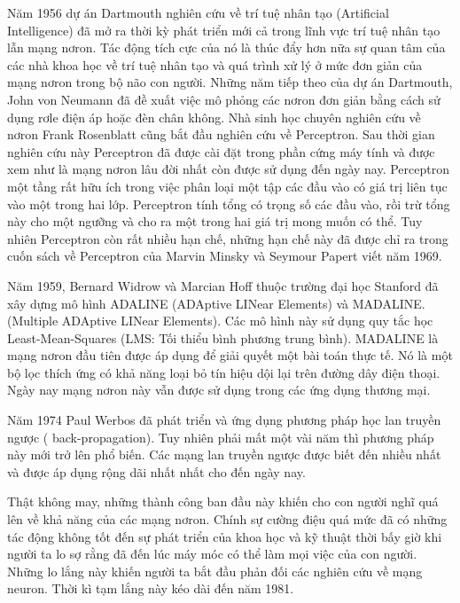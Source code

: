 Năm 1956 dự án Dartmouth nghiên cứu về trí tuệ nhân tạo (Artificial Intelligence) đã mở ra thời kỳ phát triển mới cả trong lĩnh vực trí tuệ nhân tạo lẫn mạng nơron. Tác động tích cực của nó là thúc đẩy hơn nữa sự quan tâm của các nhà khoa học về trí tuệ nhân tạo và quá trình xử lý ở mức đơn giản của mạng nơron trong bộ não con người. 
Những năm tiếp theo của dự án Dartmouth, John von Neumann đã đề xuất việc mô phỏng các nơron đơn giản bằng cách sử dụng rơle điện áp hoặc đèn chân không. Nhà sinh học chuyên nghiên cứu về nơron Frank Rosenblatt cũng bắt đầu nghiên cứu về Perceptron. Sau thời gian nghiên cứu này Perceptron đã được cài đặt trong phần cứng máy tính và được xem như là mạng nơron lâu đời nhất còn được sử dụng đến ngày nay. Perceptron một tầng rất hữu ích trong việc phân loại một tập các đầu vào có giá trị liên tục vào một trong hai lớp. Perceptron tính tổng có trọng số các đầu vào, rồi trừ tổng này cho một ngưỡng và cho ra một trong hai giá trị mong muốn có thể. Tuy nhiên Perceptron còn rất nhiều hạn chế, những hạn chế này đã được chỉ ra trong cuốn sách về Perceptron của Marvin Minsky và Seymour Papert viết năm 1969. 

Năm 1959, Bernard Widrow và Marcian Hoff thuộc trường đại học Stanford đã xây dựng mô hình ADALINE (ADAptive LINear Elements) và MADALINE. (Multiple ADAptive LINear Elements). Các mô hình này sử dụng quy tắc học Least-Mean-Squares (LMS: Tối thiểu bình phương trung bình). MADALINE là mạng nơron đầu tiên được áp dụng để giải quyết một bài toán thực tế. Nó là một bộ lọc thích ứng có khả năng loại bỏ tín hiệu dội lại trên đường dây điện thoại. Ngày nay mạng nơron này vẫn được sử dụng trong các ứng dụng thương mại. 

Năm 1974 Paul Werbos đã phát triển và ứng dụng phương pháp học lan truyền ngược ( back-propagation). Tuy nhiên phải mất một vài năm thì phương pháp này mới trở lên phổ biến. Các mạng lan truyền ngược được biết đến nhiều nhất và được áp dụng rộng dãi nhất nhất cho đến ngày nay. 

Thật không may, những thành công ban đầu này khiến cho con người nghĩ quá lên về khả năng của các mạng nơron. Chính sự cường điệu quá mức đã có những tác động không tốt đến sự phát triển của khoa học và kỹ thuật thời bấy giờ khi người ta lo sợ rằng đã đến lúc máy móc có thể làm mọi việc của con người. Những lo lắng này khiến người ta bắt đầu phản đối các nghiên cứu về mạng neuron. Thời kì tạm lắng này kéo dài đến năm 1981. 

